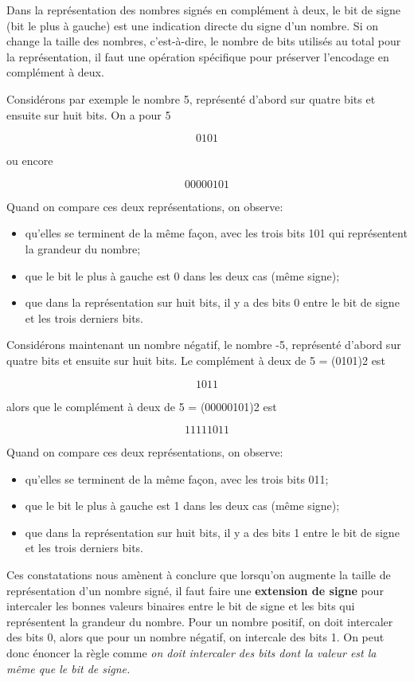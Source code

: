 \documentclass[letter, oneside]{book}
\begin{document}
\begin{enumerate}
Dans la représentation des nombres signés en complément à deux, le bit
de signe (bit le plus à gauche) est une indication directe du signe
d'un nombre. Si on change la taille des nombres, c'est-à-dire, le nombre
de bits utilisés au total pour la représentation, il faut une
opération spécifique pour préserver l'encodage en complément à deux. 

Considérons par exemple le nombre 5, représenté d'abord sur quatre
bits et ensuite sur huit bits. On a pour 5 

$$ 0101 $$

ou encore 

$$ 00000101 $$

Quand on compare ces deux représentations, on observe: 

\begin{itemize}
\item qu'elles se terminent de la même façon, avec les trois bits 101 qui
représentent la grandeur du nombre;
\item que le bit le plus à gauche est 0 dans les deux cas (même signe);
\item que dans la représentation sur huit bits, il y a des bits 0 entre le bit
de signe et les trois derniers bits.
\end{itemize}

Considérons maintenant un nombre négatif, le nombre -5, représenté
d'abord sur quatre bits et ensuite sur huit bits. Le complément à deux
de 5 = (0101)2 est

$$ 1011 $$

alors que le complément à deux de 5 = (00000101)2 est

$$ 11111011 $$

Quand on compare ces deux représentations, on observe: 

\begin{itemize}
\item qu'elles se terminent de la même façon, avec les trois bits 011;
\item que le bit le plus à gauche est 1 dans les deux cas (même signe);
\item que dans la représentation sur huit bits, il y a des bits 1 entre le bit
de signe et les trois derniers bits.
\end{itemize}

Ces constatations nous amènent à conclure que lorsqu'on augmente la
taille de représentation d'un nombre signé, il faut faire une
\textbf{extension de signe} pour intercaler les bonnes valeurs binaires entre
le bit de signe et les bits qui représentent la grandeur du
nombre. Pour un nombre positif, on doit intercaler des bits 0, alors
que pour un nombre négatif, on intercale des bits 1. On peut donc
énoncer la règle comme \emph{on doit intercaler des bits dont la valeur est
la même que le bit de signe.}


\end{enumerate}
\end{document}
